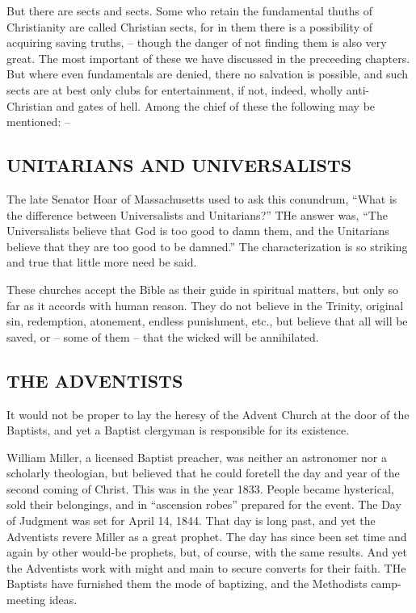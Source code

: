 \documentclass[
]{book}
\begin{document}
But there are sects and sects. Some who retain the fundamental thuths of Christianity are called Christian sects, for in them there is a possibility of acquiring saving truths, -- though the danger of not finding them is also very great. The most important of these we have discussed in the preceeding chapters. But where even fundamentals are denied, there no salvation is possible, and such sects are at best only clubs for entertainment, if not, indeed, wholly anti-Christian and gates of hell. Among the chief of these the following may be mentioned: --

\subsection{UNITARIANS AND UNIVERSALISTS}\label{unitarians-and-universalists}

The late Senator Hoar of Massachusetts used to ask this conundrum, ``What is the difference between Universalists and Unitarians?'' THe answer was, ``The Universalists believe that God is too good to damn them, and the Unitarians believe that they are too good to be damned.'' The characterization is so striking and true that little more need be said.

These churches accept the Bible as their guide in spiritual matters, but only so far as it accords with human reason. They do not believe in the Trinity, original sin, redemption, atonement, endless punishment, etc., but believe that all will be saved, or -- some of them -- that the wicked will be annihilated.

\subsection{\texorpdfstring{THE ADVENTISTS}{THE ADVENTISTS}}\label{the-adventists}

It would not be proper to lay the heresy of the Advent Church at the door of the Baptists, and yet a Baptist clergyman is responsible for its existence.

William Miller, a licensed Baptist preacher, was neither an astronomer nor a scholarly theologian, but believed that he could foretell the day and year of the second coming of Christ. This was in the year 1833. People became hysterical, sold their belongings, and in ``ascension robes'' prepared for the event. The Day of Judgment was set for April 14, 1844. That day is long past, and yet the Adventists revere Miller as a great prophet. The day has since been set time and again by other would-be prophets, but, of course, with the same results. And yet the Adventists work with might and main to secure converts for their faith. THe Baptists have furnished them the mode of baptizing, and the Methodists camp-meeting ideas.
\end{document}
